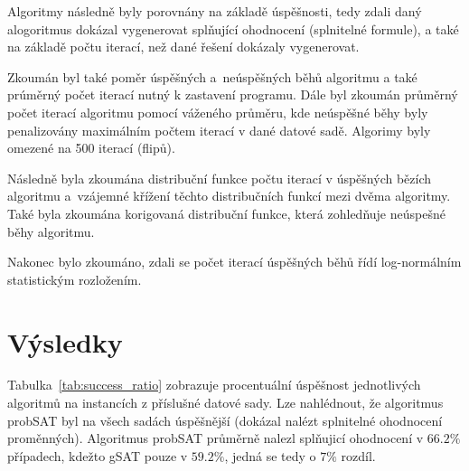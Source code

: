 \documentclass[twoside,twocolumn]{article}
\begin{document}
    Algoritmy následně byly porovnány na základě úspěšnosti, tedy zdali daný alogoritmus dokázal vygenerovat
    splňující ohodnocení (splnitelné formule), a také na základě počtu iterací, než dané řešení dokázaly vygenerovat.

    Zkoumán byl také poměr úspěšných a~neúspěšných běhů algoritmu a také prúměrný počet iterací nutný k zastavení programu.
    Dále byl zkoumán průměrný počet iterací algoritmu pomocí váženého průměru,
    kde neúspěšné běhy byly penalizovány maximálním počtem iterací v dané datové sadě.
    Algorimy byly omezené na 500 iterací (flipů).

    Následně byla zkoumána distribuční funkce počtu iterací v úspěšných bězích algoritmu a~vzájemné křížení
    těchto distribučních funkcí mezi dvěma algoritmy.
    Také byla zkoumána korigovaná distribuční funkce, která zohledňuje neúspešné běhy algoritmu.

    Nakonec bylo zkoumáno, zdali se počet iterací úspěšných běhů řídí log-normálním statistickým rozložením.



    \section{Výsledky}


    Tabulka~\ref{tab:success_ratio} zobrazuje procentuální úspěšnost jednotlivých algoritmů na instancích z příslušné datové sady.
    Lze nahlédnout, že algoritmus probSAT byl na všech sadách úspěšnější (dokázal nalézt splnitelné ohodnocení proměnných).
    Algoritmus probSAT průměrně nalezl splňujicí ohodnocení v $66.2\%$ případech, kdežto gSAT pouze v $59.2\%$, jedná se tedy o $7\%$ rozdíl.
\end{document}
